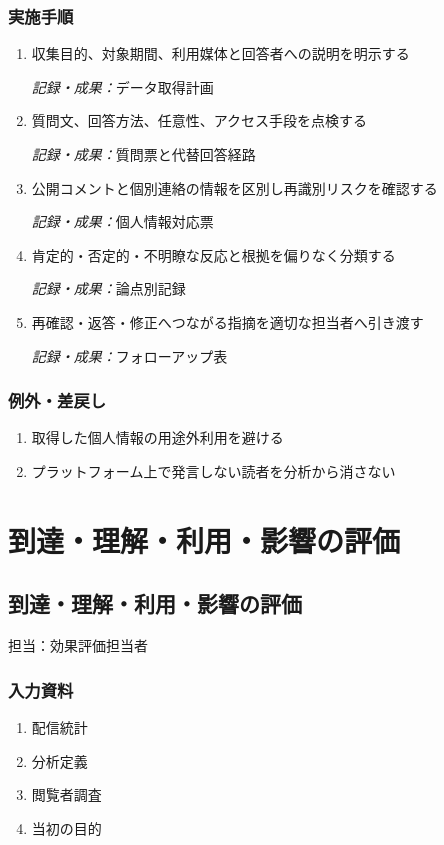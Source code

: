 \documentclass[a4paper,11pt]{article}
\begin{document}
\subsubsection*{実施手順}
\begin{enumerate}[leftmargin=2em,itemsep=0.65em]
\item 収集目的、対象期間、利用媒体と回答者への説明を明示する\par\noindent\textit{記録・成果：}データ取得計画\nobreak\smallskip
\item 質問文、回答方法、任意性、アクセス手段を点検する\par\noindent\textit{記録・成果：}質問票と代替回答経路\nobreak\smallskip
\item 公開コメントと個別連絡の情報を区別し再識別リスクを確認する\par\noindent\textit{記録・成果：}個人情報対応票\nobreak\smallskip
\item 肯定的・否定的・不明瞭な反応と根拠を偏りなく分類する\par\noindent\textit{記録・成果：}論点別記録\nobreak\smallskip
\item 再確認・返答・修正へつながる指摘を適切な担当者へ引き渡す\par\noindent\textit{記録・成果：}フォローアップ表\nobreak\smallskip
\end{enumerate}
\subsubsection*{例外・差戻し}
\begin{enumerate}[leftmargin=2em,itemsep=0.35em]
\item 取得した個人情報の用途外利用を避ける
\item プラットフォーム上で発言しない読者を分析から消さない
\end{enumerate}
\section{到達・理解・利用・影響の評価}
\subsection{到達・理解・利用・影響の評価}
\par 担当：効果評価担当者\par\medskip
\subsubsection*{入力資料}
\begin{enumerate}[leftmargin=2em,itemsep=0.35em]
\item 配信統計
\item 分析定義
\item 閲覧者調査
\item 当初の目的
\end{enumerate}
\end{document}

